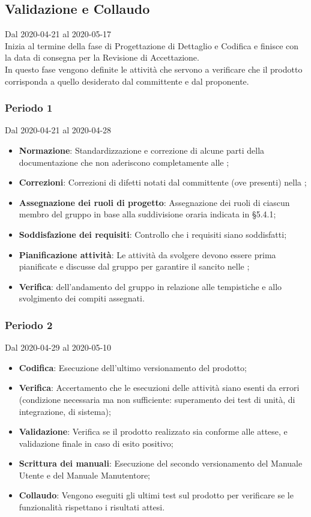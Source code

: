 \subsection{Validazione e Collaudo}
Dal 2020-04-21 al 2020-05-17\\
Inizia al termine della fase di Progettazione di Dettaglio e Codifica e finisce con la data di consegna per la Revisione di Accettazione.\\
In questo fase vengono definite le attività che servono a verificare che il prodotto corrisponda a quello desiderato dal committente e dal proponente.

\subsubsection{Periodo 1} 
Dal 2020-04-21 al 2020-04-28
\begin{itemize}
	\item \textbf{Normazione}: Standardizzazione e correzione di alcune parti della documentazione che non aderiscono completamente alle \NdP{};
	\item \textbf{Correzioni}: Correzioni di difetti notati dal committente (ove presenti) nella ;
	\item \textbf{Assegnazione dei ruoli di progetto}: Assegnazione dei ruoli di ciascun membro del gruppo in base alla suddivisione oraria indicata in §5.4.1;
	\item \textbf{Soddisfazione dei requisiti}: Controllo che i requisiti siano soddisfatti;
	\item \textbf{Pianificazione attività}: Le attività da svolgere devono essere prima pianificate e discusse dal gruppo per garantire il  sancito nelle \NdP{};
	\item \textbf{Verifica}:  dell'andamento del gruppo in relazione alle tempistiche e allo svolgimento dei compiti assegnati.
\end{itemize}

\subsubsection{Periodo 2} 
Dal 2020-04-29 al 2020-05-10
\begin{itemize}
	\item \textbf{Codifica}: Esecuzione dell'ultimo versionamento del prodotto;
	\item \textbf{Verifica}: Accertamento che le esecuzioni delle attività siano esenti da errori (condizione necessaria ma non sufficiente: superamento dei test di unità, di integrazione, di sistema);
	\item \textbf{Validazione}: Verifica se il prodotto realizzato sia conforme alle attese, e validazione finale in caso di esito positivo;
	\item \textbf{Scrittura dei manuali}: Esecuzione del secondo versionamento del Manuale Utente e del Manuale Manutentore;
	\item \textbf{Collaudo}: Vengono eseguiti gli ultimi test sul prodotto per verificare se le funzionalità rispettano i risultati attesi.
\end{itemize}

